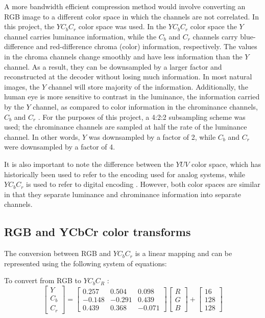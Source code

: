 \documentclass[10pt,twocolumn,letterpaper]{article}
\begin{document}
A more bandwidth efficient compression method would involve converting an RGB image to a different color space in which the channels are not correlated. In this project, the $YC_bC_r$ color space was used. In the $YC_bC_r$ color space the $Y$ channel carries luminance information, while the $C_b$ and $C_r$ channels carry blue-difference and red-difference chroma (color) information, respectively. The values in the chroma channels change smoothly and have less information than the $Y$ channel. As a result, they can be downsampled by a larger factor and reconstructed at the decoder without losing much information. In most natural images, the $Y$ channel will store majority of the information. Additionally, the human eye is more sensitive to contrast in the luminance, the information carried by the $Y$ channel, as compared to color information in the chrominance channels, $C_b$ and $C_r$ \cite{Article1}. For the purposes of this project, a 4:2:2 subsampling scheme was used; the chrominance channels are sampled at half the rate of the luminance channel. In other words, $Y$ was downsampled by a factor of 2, while $C_b$ and $C_r$ were downsampled by a factor of 4.

It is also important to note the difference between the $YUV$ color space, which has historically been used to refer to the encoding used for analog systems, while $YC_bC_r$ is used to refer to digital encoding \cite{Article2}. However, both color spaces are similar in that they separate luminance and chrominance information into separate channels. 

\subsection{RGB and YCbCr color transforms}

The conversion between RGB and $YC_bC_r$ is a linear mapping and can be represented using the following system of equations:

To convert from RGB to $YC_bC_R$ \cite{Article1}:
\[
\begin{bmatrix}
Y\\ 
C_b\\ 
C_r
\end{bmatrix}=\begin{bmatrix}
 0.257&0.504&0.098 \\ 
 -0.148&-0.291&0.439\\ 
 0.439&0.368&-0.071 
\end{bmatrix}\begin{bmatrix}
R\\ 
G\\ 
B
\end{bmatrix} + \begin{bmatrix}
16\\ 
128\\ 
128
\end{bmatrix}
\]
\end{document}

